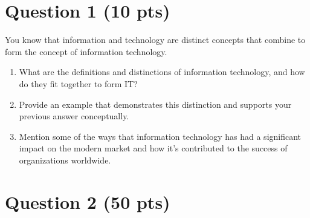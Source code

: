 \pagebreak
\section{Question 1 \normalsize(10 pts)} 

\begin{question}
	You know that information and technology are distinct concepts that combine to form the concept of information technology.
	\begin{enumerate}
		\item What are the definitions and distinctions of information technology, and how do they fit together to form IT?
		\item Provide an example that demonstrates this distinction and supports your previous answer conceptually.
		\item Mention some of the ways that information technology has had a significant impact on the modern market and how it's contributed to the success of organizations worldwide.
	\end{enumerate}
\end{question}

\pagebreak
\begin{answer}

\end{answer}

\pagebreak
\section{Question 2 \normalsize(50 pts)}

